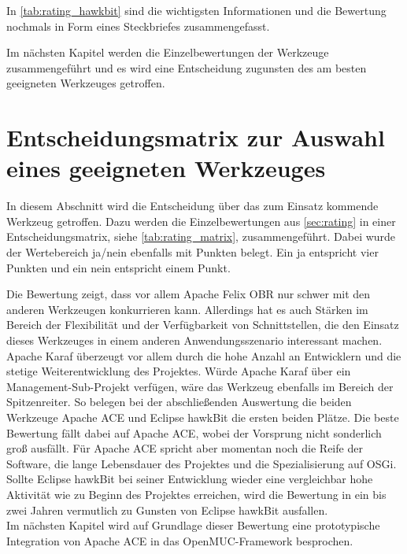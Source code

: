 In \autoref{tab:rating_hawkbit} sind die wichtigsten Informationen und die Bewertung nochmals in Form eines Steckbriefes zusammengefasst.

Im nächsten Kapitel werden die Einzelbewertungen der Werkzeuge zusammengeführt und es wird eine Entscheidung zugunsten des am besten geeigneten Werkzeuges getroffen.


\section{Entscheidungsmatrix zur Auswahl eines geeigneten Werkzeuges}
\label{sec:matrix}
In diesem Abschnitt wird die Entscheidung über das zum Einsatz kommende Werkzeug getroffen. Dazu werden die Einzelbewertungen aus \autoref{sec:rating} 
in einer Entscheidungsmatrix, siehe \autoref{tab:rating_matrix}, zusammengeführt.
Dabei wurde der Wertebereich ja/nein ebenfalls mit Punkten belegt. Ein ja entspricht vier Punkten und ein nein entspricht einem Punkt.



Die Bewertung zeigt, dass vor allem Apache Felix OBR nur schwer mit den anderen Werkzeugen konkurrieren kann. 
Allerdings hat es auch Stärken im Bereich der Flexibilität und der Verfügbarkeit von Schnittstellen, die den Einsatz dieses Werkzeuges in einem anderen
Anwendungsszenario interessant machen. Apache Karaf überzeugt vor allem durch die hohe Anzahl an Entwicklern und die stetige Weiterentwicklung des Projektes.
Würde Apache Karaf über ein Management-Sub-Projekt verfügen, wäre das Werkzeug ebenfalls im Bereich der Spitzenreiter.
So belegen bei der abschließenden Auswertung die beiden Werkzeuge Apache ACE und Eclipse hawkBit die ersten beiden Plätze.
Die beste Bewertung fällt dabei auf Apache ACE, wobei der Vorsprung nicht sonderlich groß ausfällt.
Für Apache ACE spricht aber momentan noch die Reife der Software, die lange Lebensdauer des Projektes und die Spezialisierung auf \ac{OSGi}.
Sollte Eclipse hawkBit bei seiner Entwicklung wieder eine vergleichbar hohe Aktivität wie zu Beginn des Projektes erreichen,
wird die Bewertung in ein bis zwei Jahren vermutlich zu Gunsten von Eclipse hawkBit ausfallen.\\

Im nächsten Kapitel wird auf Grundlage dieser Bewertung eine prototypische Integration von Apache ACE in das OpenMUC-Framework besprochen.



